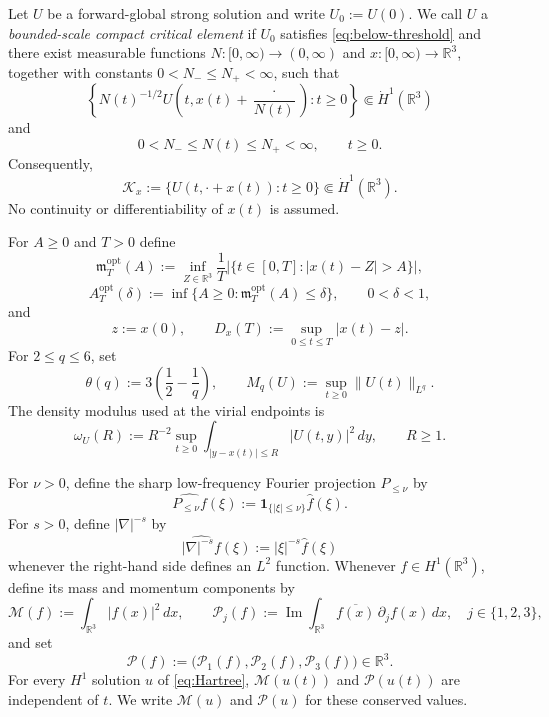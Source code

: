 \documentclass[preprint,12pt]{elsarticle}
\numberwithin{equation}{section}
\theoremstyle{remark}
\newcommand{\R}{\mathbb R}
\newcommand{\dd}{\,d}
\newcommand{\one}{\mathbf 1}
\newcommand{\mopt}{\mathfrak m^{\mathrm{opt}}}
\newcommand{\Aopt}{A^{\mathrm{opt}}}
\newcommand{\Mcal}{\mathcal M}
\newcommand{\Pcal}{\mathcal P}
\begin{document}
Let $U$ be a forward-global strong solution and write $U_0:=U(0)$. We call $U$ a \emph{bounded-scale compact critical element} if $U_0$ satisfies \eqref{eq:below-threshold} and there exist measurable functions $N:[0,\infty)\to(0,\infty)$ and $x:[0,\infty)\to\R^3$, together with constants $0<N_-\le N_+<\infty$, such that
\begin{equation}\label{eq:AP-intro}
  \left\{
  N(t)^{-1/2}U\left(t,x(t)+\frac{\cdot}{N(t)}\right):t\ge0
  \right\}
  \Subset\dot H^1(\R^3)
\end{equation}
and
\begin{equation}\label{eq:bounded-scale-intro}
  0<N_-\le N(t)\le N_+<\infty,
  \qquad t\ge0.
\end{equation}
Consequently,
\begin{equation}\label{eq:translated-orbit-intro}
  \mathcal K_x
  :=\{U(t,\cdot+x(t)):t\ge0\}
  \Subset\dot H^1(\R^3).
\end{equation}
No continuity or differentiability of $x(t)$ is assumed.

For $A\ge0$ and $T>0$ define
\begin{equation}\label{eq:mopt-def}
  \mopt_T(A)
  :=\inf_{Z\in\R^3}\frac1T
  \left|\{t\in[0,T]:|x(t)-Z|>A\}\right|,
\end{equation}
\begin{equation}\label{eq:Aopt-def}
  \Aopt_T(\delta)
  :=\inf\{A\ge0:\mopt_T(A)\le\delta\},
  \qquad 0<\delta<1,
\end{equation}
and
\begin{equation}\label{eq:z-Dx}
  z:=x(0),
  \qquad
  D_x(T):=\sup_{0\le t\le T}|x(t)-z|.
\end{equation}
For $2\le q\le6$, set
\begin{equation}\label{eq:theta}
  \theta(q):=3\left(\frac12-\frac1q\right),
  \qquad
  M_q(U):=\sup_{t\ge0}\|U(t)\|_{L^q}.
\end{equation}
The density modulus used at the virial endpoints is
\begin{equation}\label{eq:density-modulus-intro}
  \omega_U(R)
  :=R^{-2}\sup_{t\ge0}
  \int_{|y-x(t)|\le R}|U(t,y)|^2\dd y,
  \qquad R\ge1.
\end{equation}

For $\nu>0$, define the sharp low-frequency Fourier projection $P_{\le\nu}$ by
\[
  \widehat{P_{\le\nu}f}(\xi)
  :=\one_{\{|\xi|\le\nu\}}\widehat f(\xi).
\]
For $s>0$, define $|\nabla|^{-s}$ by
\[
  \widehat{|\nabla|^{-s}f}(\xi):=|\xi|^{-s}\widehat f(\xi)
\]
whenever the right-hand side defines an $L^2$ function. Whenever $f\in H^1(\R^3)$, define its mass and momentum components by
\begin{equation}\label{eq:mass-momentum-intro}
  \Mcal(f):=\int_{\R^3}|f(x)|^2\dd x,
  \qquad
  \Pcal_j(f):=\operatorname{Im}
  \int_{\R^3}\overline{f(x)}\,\partial_jf(x)\dd x,
  \quad j\in\{1,2,3\},
\end{equation}
and set
\begin{equation*}
  \Pcal(f):=\bigl(\Pcal_1(f),\Pcal_2(f),\Pcal_3(f)\bigr)\in\R^3.
\end{equation*}
For every $H^1$ solution $u$ of \eqref{eq:Hartree}, $\Mcal(u(t))$ and $\Pcal(u(t))$ are independent of $t$. We write $\Mcal(u)$ and $\Pcal(u)$ for these conserved values.
\end{document}
